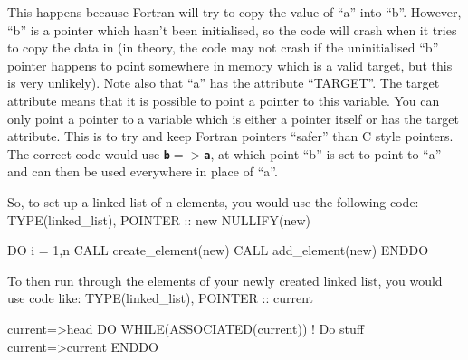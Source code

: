 \documentclass[12pt,a4paper]{article}
\newcommand{\inlinecode}[1]{{\color{warwickred} \bf\texttt{#1}}}
\newenvironment{boxverbatim}{\lboxverbatim{none}}{\endlboxverbatim}
\begin{document}
This happens because Fortran will try to copy the value of ``a'' into ``b''.
However, ``b'' is a pointer which hasn't been initialised, so the code will
crash when it tries to copy the data in (in theory, the code may not crash if
the uninitialised ``b'' pointer happens to point somewhere in memory which is
a valid target, but this is very unlikely). Note also that ``a'' has the
attribute ``TARGET''. The target attribute means that it is possible to point
a pointer to this variable. You can only point a pointer to a variable which
is either a pointer itself or has the target attribute. This is to try and
keep Fortran pointers ``safer'' than C style pointers. The correct code would
use \inlinecode{b$=>$a}, at which point ``b'' is set to point to ``a'' and
can then be used everywhere in place of ``a''.

So, to set up a linked list of n elements, you would use the following code:
\begin{boxverbatim}
TYPE(linked_list), POINTER :: new
NULLIFY(new)

DO i = 1,n
  CALL create_element(new)
  CALL add_element(new)
ENDDO
\end{boxverbatim}

To then run through the elements of your newly created linked list, you would
use code like:
\begin{boxverbatim}
TYPE(linked_list), POINTER :: current

current=>head
DO WHILE(ASSOCIATED(current))
  ! Do stuff
  current=>current%
ENDDO
\end{boxverbatim}
\end{document}
